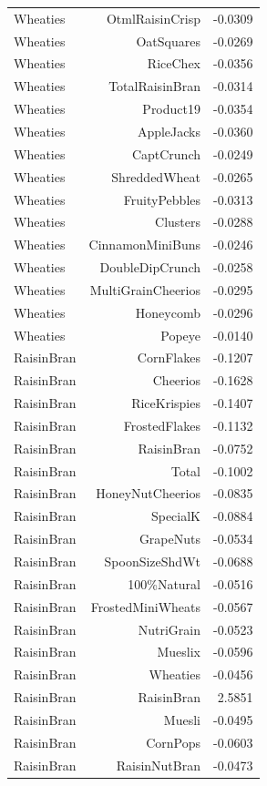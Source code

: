 \begin{longtable}{@{}lrr@{}}
Wheaties & OtmlRaisinCrisp & -0.0309 \\
Wheaties & OatSquares & -0.0269 \\
Wheaties & RiceChex & -0.0356 \\
Wheaties & TotalRaisinBran & -0.0314 \\
Wheaties & Product19 & -0.0354 \\
Wheaties & AppleJacks & -0.0360 \\
Wheaties & CaptCrunch & -0.0249 \\
Wheaties & ShreddedWheat & -0.0265 \\
Wheaties & FruityPebbles & -0.0313 \\
Wheaties & Clusters & -0.0288 \\
Wheaties & CinnamonMiniBuns & -0.0246 \\
Wheaties & DoubleDipCrunch & -0.0258 \\
Wheaties & MultiGrainCheerios & -0.0295 \\
Wheaties & Honeycomb & -0.0296 \\
Wheaties & Popeye & -0.0140 \\
RaisinBran & CornFlakes & -0.1207 \\
RaisinBran & Cheerios & -0.1628 \\
RaisinBran & RiceKrispies & -0.1407 \\
RaisinBran & FrostedFlakes & -0.1132 \\
RaisinBran & RaisinBran & -0.0752 \\
RaisinBran & Total & -0.1002 \\
RaisinBran & HoneyNutCheerios & -0.0835 \\
RaisinBran & SpecialK & -0.0884 \\
RaisinBran & GrapeNuts & -0.0534 \\
RaisinBran & SpoonSizeShdWt & -0.0688 \\
RaisinBran & 100\%Natural & -0.0516 \\
RaisinBran & FrostedMiniWheats & -0.0567 \\
RaisinBran & NutriGrain & -0.0523 \\
RaisinBran & Mueslix & -0.0596 \\
RaisinBran & Wheaties & -0.0456 \\
RaisinBran & RaisinBran & 2.5851 \\
RaisinBran & Muesli & -0.0495 \\
RaisinBran & CornPops & -0.0603 \\
RaisinBran & RaisinNutBran & -0.0473 \\

\end{longtable}
